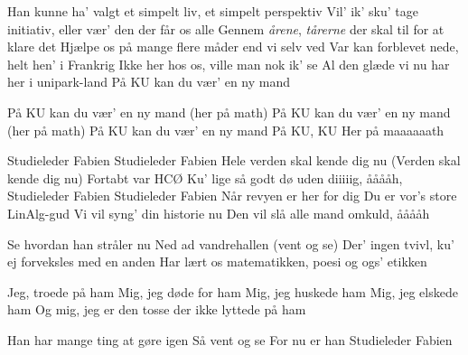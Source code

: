 \documentclass[a4paper,11pt]{article}
\begin{document}
\begin{song}
 Han kunne ha' valgt et simpelt liv, et simpelt perspektiv
Vil' ik' sku' tage initiativ, eller vær' den der får os alle
Gennem \emph{årene}, \emph{tårerne} der skal til for at klare det
Hjælpe os på mange flere måder end vi selv ved
Var kan forblevet nede, helt hen' i Frankrig
Ikke her hos os, ville man nok ik' se
Al den glæde vi nu har her i unipark-land
På KU kan du vær' en ny mand

 På KU kan du vær' en ny mand (her på math)
På KU kan du vær' en ny mand (her på math)
På KU kan du vær' en ny mand
På KU, KU
 Her på maaaaaath

 Studieleder Fabien
Studieleder Fabien
Hele verden skal kende dig nu
(Verden skal kende dig nu)
Fortabt var HCØ
Ku' lige så godt dø uden diiiiig, ååååh,
Studieleder Fabien
Studieleder Fabien
Når revyen er her for dig
Du er vor's store LinAlg-gud
Vi vil syng' din historie nu
Den vil slå alle mand omkuld, ååååh

 Se hvordan han stråler nu
Ned ad vandrehallen (vent og se)
Der' ingen tvivl, ku' ej forveksles med en anden
Har lært os matematikken, poesi og ogs' etikken

 Jeg, troede på ham
 Mig, jeg døde for ham
 Mig, jeg huskede ham
 Mig, jeg elskede ham
 Og mig, jeg er den tosse der ikke lyttede på ham

 Han har mange ting at gøre igen
Så vent og se
 For nu er han
 Studieleder Fabien
\end{song}
\end{document}
